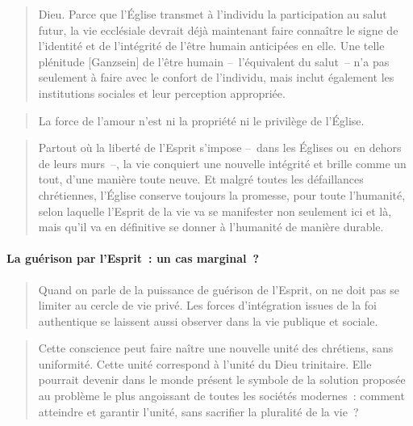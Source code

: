 \begin{quote}
    Dieu. Parce que l’Église transmet à l’individu la participation au salut futur, la vie ecclésiale devrait déjà maintenant faire connaître le signe de l’identité et de l’intégrité de l’être humain anticipées en elle. Une telle plénitude [Ganzsein] de l’être humain – l’équivalent du salut – n’a pas seulement à faire avec le confort de l’individu, mais inclut également les institutions sociales et leur perception appropriée.\cite[pp. 106-107]{Pannenberg:RoyaumeDieu} 
\end{quote}

\begin{quote}
    La force de l’amour n’est ni la propriété ni le privilège de l’Église.\cite[p. 112]{Pannenberg:RoyaumeDieu}
\end{quote}

\begin{quote}
    Partout où la liberté de l’Esprit s’impose – dans les Églises ou en dehors de leurs murs –, la vie conquiert une nouvelle intégrité et brille comme un tout, d’une manière toute neuve. Et malgré toutes les défaillances chrétiennes, l’Église conserve toujours la promesse, pour toute l’humanité, selon laquelle l’Esprit de la vie va se manifester non seulement ici et là, mais qu’il va en définitive se donner à l’humanité de manière durable. \cite[p. 113]{Pannenberg:RoyaumeDieu}
\end{quote}

\paragraph{La guérison par l’Esprit : un cas marginal ?}

\begin{quote}
    Quand on parle de la puissance de guérison de l’Esprit, on ne doit pas se limiter au cercle de vie privé. Les forces d’intégration issues de la foi authentique se laissent aussi observer dans la vie publique et sociale.\cite[p. 116]{Pannenberg:RoyaumeDieu}
\end{quote}



\begin{quote}
    Cette conscience peut faire naître une nouvelle unité des chrétiens, sans uniformité. Cette unité correspond à l’unité du Dieu trinitaire. Elle pourrait devenir dans le monde présent le symbole de la solution proposée au problème le plus angoissant de toutes les sociétés modernes : comment atteindre et garantir l’unité, sans sacrifier la pluralité de la vie ?\cite[p. 144]{Pannenberg:RoyaumeDieu}
\end{quote}